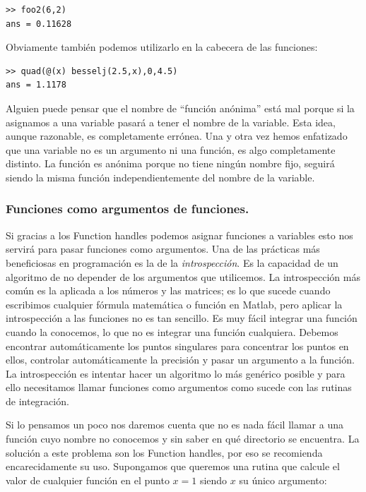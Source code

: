 \begin{verbatim}
>> foo2(6,2)
ans = 0.11628
\end{verbatim}
Obviamente también podemos utilizarlo en la cabecera de las funciones:

\begin{verbatim}
>> quad(@(x) besselj(2.5,x),0,4.5)
ans = 1.1178
\end{verbatim}
Alguien puede pensar que el nombre de {}``función anónima'' está mal
porque si la asignamos a una variable pasará a tener el nombre de la
variable. Esta idea, aunque razonable, es completamente errónea.  Una
y otra vez hemos enfatizado que una variable no es un argumento ni una
función, es algo completamente distinto. La función es anónima porque
no tiene ningún nombre fijo, seguirá siendo la misma función
independientemente del nombre de la variable.


\subsubsection{Funciones como argumentos de funciones.}

Si gracias a los Function handles podemos asignar funciones a
variables esto nos servirá para pasar funciones como argumentos. Una
de las prácticas más beneficiosas en programación es la de la
\emph{introspección}.  Es la capacidad de un
algoritmo de no depender de los argumentos que utilicemos. La
introspección más común es la aplicada a los números y las matrices;
es lo que sucede cuando escribimos cualquier fórmula matemática o
función en Matlab, pero aplicar la introspección a las funciones no es
tan sencillo. Es muy fácil integrar una función cuando la conocemos,
lo que no es integrar una función cualquiera. Debemos encontrar
automáticamente los puntos singulares para concentrar los puntos en
ellos, controlar automáticamente la precisión y pasar un argumento a
la función. La introspección es intentar hacer un algoritmo lo más
genérico posible y para ello necesitamos llamar funciones como
argumentos como sucede con las rutinas de integración.

Si lo pensamos un poco nos daremos cuenta que no es nada fácil llamar
a una función cuyo nombre no conocemos y sin saber en qué directorio
se encuentra. La solución a este problema son los Function handles,
por eso se recomienda encarecidamente su uso. Supongamos que queremos
una rutina que calcule el valor de cualquier función en el punto $x=1$
siendo $x$ su único argumento:

